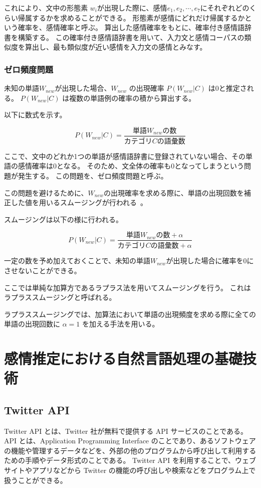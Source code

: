 \documentclass[11pt,a4j]{jsarticle}
\begin{document}
これにより、文中の形態素 $w_i$が出現した際に、感情$e_1,e_2, \cdots ,e_7$にそれぞれどのくらい帰属するかを求めることができる。
形態素が感情にどれだけ帰属するかという確率を、感情確率と呼ぶ。
算出した感情確率をもとに、確率付き感情語辞書を構築する。
この確率付き感情語辞書を用いて、入力文と感情コーパスの類似度を算出し、最も類似度が近い感情を入力文の感情とみなす。

\subsubsection{ゼロ頻度問題}\label{sec:zero}
未知の単語$W_\mathit{new}$が出現した場合、$W_\mathit{new}$ の出現確率 $P(W_\mathit{new}|C)$ は0と推定される。
$P(W_\mathit{new}|C)$ は複数の単語例の確率の積から算出する。

以下に数式を示す。

\[
P(W_\mathit{new}|C)=\frac{単語 W_\mathit{new} の数}{カテゴリC の語彙数}
\]

ここで、文中のどれか1つの単語が感情語辞書に登録されていない場合、その単語の感情確率は0となる。
そのため、文全体の確率も0となってしまうという問題が発生する。
この問題を、ゼロ頻度問題と呼ぶ。


この問題を避けるために、$W_\mathit{new}$の出現確率を求める際に、単語の出現回数を補正した値を用いるスムージングが行われる~。

スムージングは以下の様に行われる。

\[
P(W_\mathit{new}|C)=\frac{単語 W_\mathit{new} の数 + \alpha }{カテゴリC の語彙数 + \alpha }
\]

一定の数を予め加えておくことで、未知の単語$W_\mathit{new}$が出現した場合に確率を0にさせないことができる。

ここでは単純な加算方であるラプラス法を用いてスムージングを行う。
これはラプラススムージングと呼ばれる。

ラプラススムージングでは、加算法において単語の出現頻度を求める際に全ての単語の出現回数に $\alpha=1$ を加える手法を用いる。
 
\section{感情推定における自然言語処理の基礎技術}
\subsection{Twitter API}
 Twitter API とは、Twitter 社が無料で提供する API サービスのことである。
API とは、Application Programming Interface のことであり、あるソフトウェアの機能や管理するデータなどを、外部の他のプログラムから呼び出して利用するための手順やデータ形式のことである。
Twitter API を利用することで、ウェブサイトやアプリなどから Twitter の機能の呼び出しや検索などをプログラム上で扱うことができる。
\end{document}
